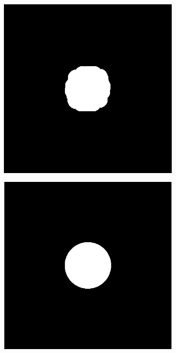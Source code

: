 \documentclass{article}
\begin{document}
\begin{figure}[!htb]
\begin{subfigure}[b]{0.24\textwidth}
                \caption{}
                \label{fig:gull2}
        \end{subfigure}%
        \hspace{\fill}
        \begin{subfigure}[b]{0.24\textwidth}
                \includegraphics[width=\linewidth]{step7}
                \caption{}
                \label{fig:tiger}
        \end{subfigure}%
        \hspace{\fill}
        \begin{subfigure}[b]{0.24\textwidth}
                \includegraphics[width=\linewidth]{step8}

\end{subfigure}
\end{figure}
\end{document}
